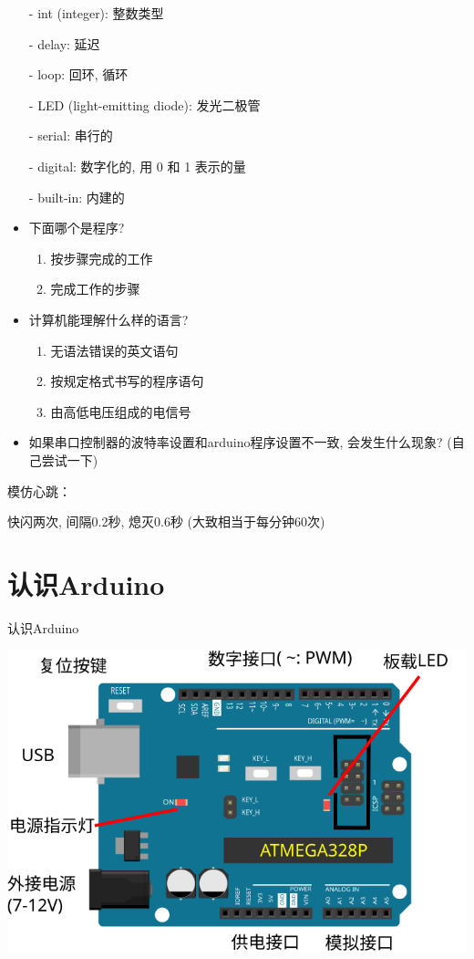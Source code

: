 \documentclass[a4paper,11pt]{seminar}
\begin{document}
\begin{itemize}
    \item[-] int (integer): 整数类型
    \item[-] delay: 延迟
    \item[-] loop: 回环, 循环
    \item[-] LED (light-emitting diode): 发光二极管
    \item[-] serial: 串行的 
    \item[-] digital: 数字化的, 用 0 和 1 表示的量
    \item[-] built-in: 内建的
\end{itemize}
\endslide

\begin{itemize}
    \item 下面哪个是程序?
    \begin{enumerate}
        \item 按步骤完成的工作
        \item 完成工作的步骤
    \end{enumerate}
    \item 计算机能理解什么样的语言?
    \begin{enumerate}
        \item 无语法错误的英文语句
        \item 按规定格式书写的程序语句 
        \item 由高低电压组成的电信号
    \end{enumerate}
    \item 如果串口控制器的波特率设置和arduino程序设置不一致,
        会发生什么现象? (自己尝试一下)
\end{itemize}
\endslide


模仿心跳：

快闪两次, 间隔0.2秒, 熄灭0.6秒 (大致相当于每分钟60次)
\endslide

\chapter{认识Arduino}{认识Arduino}

\centering
\includegraphics[width=.8\textwidth]{ArduinoC}
\endslide
\end{document}
